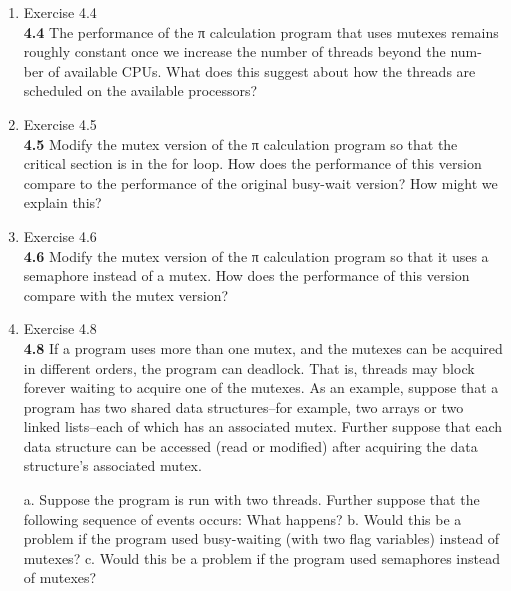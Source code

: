 \documentclass[11pt,epsfig,letterpaper]{article}
\begin{document}
\begin{enumerate}
            \item Exercise 4.4 \\
            {\bf 4.4}\>\> The performance of the π calculation program that uses mutexes remains roughly constant once we increase the number of threads beyond the num- ber of available CPUs. What does this suggest about how the threads are scheduled on the available processors?
            \vspace{0.5pc}

            \item Exercise 4.5 \\
            {\bf 4.5}\>\> Modify the mutex version of the π calculation program so that the critical section is in the for loop. How does the performance of this version compare to the performance of the original busy-wait version? How might we explain this?
            \vspace{0.5pc}

            \item Exercise 4.6 \\
            {\bf 4.6}\>\> Modify the mutex version of the π calculation program so that it uses a semaphore instead of a mutex. How does the performance of this version compare with the mutex version?
            \vspace{0.5pc}

            \item Exercise 4.8 \\
            {\bf 4.8}\>\> If a program uses more than one mutex, and the mutexes can be acquired in different orders, the program can deadlock. That is, threads may block forever waiting to acquire one of the mutexes. As an example, suppose that a program has two shared data structures–for example, two arrays or two linked lists–each of which has an associated mutex. Further suppose that each data structure can be accessed (read or modified) after acquiring the data structure’s associated mutex.

            a. Suppose the program is run with two threads. Further suppose that the following sequence of events occurs:
            What happens?
            b. Would this be a problem if the program used busy-waiting (with two flag variables) instead of mutexes?
            c. Would this be a problem if the program used semaphores instead of mutexes?
            \vspace{0.5pc}





    \end{enumerate}
\end{document}
